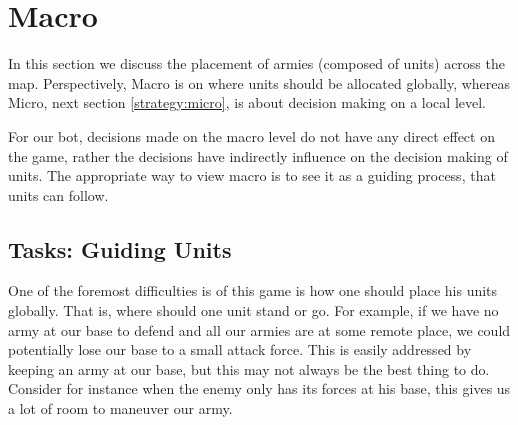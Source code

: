 %
%
%
%
%

\section{Macro}
\label{strategy:macro}
In this section we discuss the placement of armies (composed of units) across the map. Perspectively, Macro is on where units should be allocated globally, whereas Micro, next section \ref{strategy:micro}, is about decision making on a local level. 

For our bot, decisions made on the macro level do not have any direct effect on the game, rather the decisions have indirectly influence on the decision making of units. The appropriate way to view macro is to see it as a guiding process, that units can follow.

\subsection{Tasks: Guiding Units}
One of the foremost difficulties is of this game is how one should place his units globally. That is, where should one unit stand or go. For example, if we have no army at our base to defend and all our armies are at some remote place, we could potentially lose our base to a small attack force. This is easily addressed by keeping an army at our base, but this may not always be the best thing to do. Consider for instance when the enemy only has its forces at his base, this gives us a lot of room to maneuver our army. 

